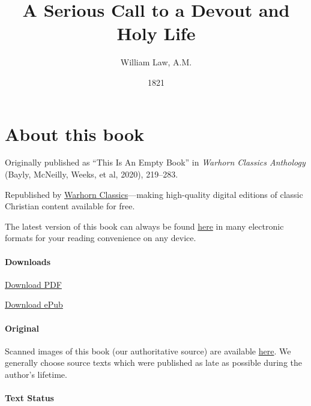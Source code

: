 \documentclass[
]{book}
\title{A Serious Call to a Devout and Holy Life}
\author{William Law, A.M.}
\date{1821}
\begin{document}
\maketitle

\mainmatter
{}

{
\setcounter{tocdepth}{1}
\tableofcontents
}
\hypertarget{about-this-book}{%
\chapter*{About this book}\label{about-this-book}}

Originally published as ``This Is An Empty Book'' in \emph{Warhorn Classics Anthology} (Bayly, McNeilly, Weeks, et al, 2020), 219--283.

Republished by \href{https://classics.warhornmedia.com/}{Warhorn Classics}---making high-quality digital editions of classic Christian content available for free.

The latest version of this book can always be found \href{https://warhornmedia.github.io/law-serious-call/}{here} in many electronic formats for your reading convenience on any device.

\hypertarget{downloads}{%
\subsubsection*{Downloads}\label{downloads}}

\href{https://warhornmedia.github.io/law-serious-call//Law-A_Serious_Call_To_A_Devout_And_Holy_Life.pdf}{Download PDF}

\href{https://warhornmedia.github.io/law-serious-call//Law-A_Serious_Call_To_A_Devout_And_Holy_Life.epub}{Download ePub}

\hypertarget{original}{%
\subsubsection*{Original}\label{original}}

Scanned images of this book (our authoritative source) are available \href{https://archive.org/details/aseriouscalltoa00unkngoog}{here}. We generally choose source texts which were published as late as possible during the author's lifetime.

\hypertarget{text-status}{%
\subsubsection*{Text Status}\label{text-status}}
\end{document}
